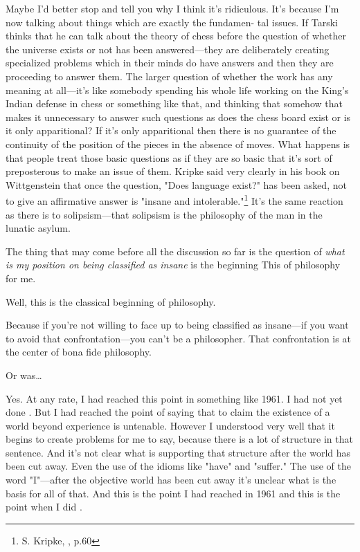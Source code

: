 Maybe I'd better stop and tell you why I think it's ridiculous. It's 
because I'm now talking about things which are exactly the fundamen- 
tal issues. If Tarski thinks that he can talk about the theory of chess 
before the question of whether the universe exists or not has been 
answered---they are deliberately creating specialized problems which in 
their minds do have answers and then they are proceeding to answer 
them. The larger question of whether the work has any meaning at 
all---it's like somebody spending his whole life working on the King's 
Indian defense in chess or something like that, and thinking that 
somehow that makes it unnecessary to answer such questions as does 
the chess board exist or is it only apparitional? If it's only apparitional 
then there is no guarantee of the continuity of the position of the pieces 
in the absence of moves. What happens is that people treat those basic 
questions as if they are so basic that it's sort of preposterous to make an 
issue of them. Kripke said very clearly in his book on Wittgenstein that 
once the question, "Does language exist?" has been asked, not to give 
an affirmative answer is "insane and intolerable."\footnote{S. Kripke, 
, p.60} 
It's the same reaction as there is to solipsism---that solipsism is the philosophy of the 
man in the lunatic asylum. 

The thing that may come before all the discussion so far is the 
question of \emph{what is my position on being classified as insane} is the 
beginning This of philosophy for me. 

 Well, this is the classical beginning of philosophy. 

 Because if you're not willing to face up to being classified as 
insane---if you want to avoid that confrontation---you can't be a 
philosopher. That confrontation is at the center of bona fide philosophy. 

 Or was\ldots

 Yes. At any rate, I had reached this point in something like 
1961. I had not yet done . But I had reached 
the point of saying that to claim the existence of a world beyond 
experience is untenable. However I understood very well that it begins 
to create problems for me to say, 
because there is a lot of structure in that sentence. And it's not clear 
what is supporting that structure after the world has been cut away. 
Even the use of the idioms like "have" and "suffer." The use of the word 
"I"---after the objective world has been cut away it's unclear what is the 
basis for all of that. And this is the point I had reached in 1961 and this is 
the point when I did .

